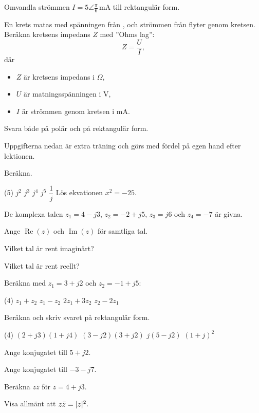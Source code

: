 Omvandla strömmen $I = 5\angle\frac{\pi}{6}\,\text{mA}$ till rektangulär form.

En krets matas med spänningen från , och strömmen från  flyter genom
kretsen. Beräkna kretsens impedans $Z$ med ”Ohms lag”:
\[
  Z = \frac{U}{I},
\]
där
\begin{itemize}
  \item $Z$ är kretsens impedans i $\Omega$,
  \item $U$ är matningsspänningen i V,
  \item $I$ är strömmen genom kretsen i mA.
\end{itemize}
Svara både på polär och på rektangulär form.

Uppgifterna nedan är extra träning och görs med fördel på egen hand efter lektionen.

Beräkna.
\begin{delar}(5)
  \task $j^2$
  \task $j^3$
  \task $j^4$
  \task $j^5$
  \task $\dfrac{1}{j}$
  \task* Lös ekvationen $x^2 = -25$.
\end{delar}

De komplexa talen $z_1 = 4 - j3$, $z_2 = -2 + j5$, $z_3 = j6$ och $z_4 = -7$ är givna.
\begin{parts}
  \item Ange $\operatorname{Re}(z)$ och $\operatorname{Im}(z)$ för samtliga tal.
  \item Vilket tal är rent imaginärt?
  \item Vilket tal är rent reellt?
\end{parts}

Beräkna med $z_1 = 3 + j2$ och $z_2 = -1 + j5$:
\begin{delar}(4)
  \task $z_1 + z_2$
  \task $z_1 - z_2$
  \task $2z_1 + 3z_2$
  \task $z_2 - 2z_1$
\end{delar}

Beräkna och skriv svaret på rektangulär form.
\begin{delar}(4)
  \task $(2 + j3)(1 + j4)$
  \task $(3 - j2)(3 + j2)$
  \task $j(5 - j2)$
  \task $(1 + j)^2$
\end{delar}

\begin{parts}
  \item Ange konjugatet till $5 + j2$.
  \item Ange konjugatet till $-3 - j7$.
  \item Beräkna $z\bar{z}$ för $z = 4 + j3$.
  \item Visa allmänt att $z\bar{z} = \lvert z\rvert^2$.
\end{parts}

